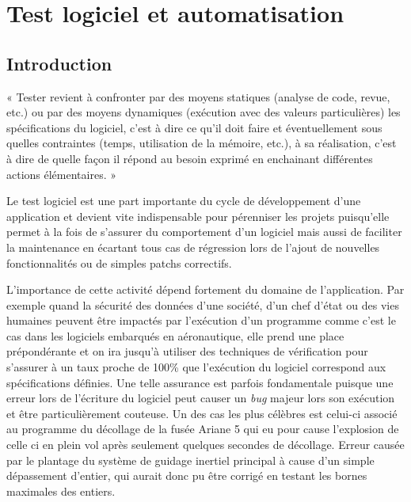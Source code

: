 \chapter{Test logiciel et automatisation} %

\label{Chapter1} %


\section{Introduction}

« Tester revient à confronter par des moyens statiques (analyse de code, revue, etc.) ou par des moyens dynamiques (exécution avec des valeurs particulières) les spécifications du logiciel, c’est à dire ce qu’il doit faire et éventuellement sous quelles contraintes (temps, utilisation de la mémoire, etc.), à sa réalisation, c’est à dire de quelle façon il répond au besoin exprimé en enchainant différentes actions élémentaires. »\cite{jfpp-test}

Le test logiciel est une part importante du cycle de développement d'une application et devient vite indispensable pour pérenniser les projets puisqu'elle permet à la fois de s'assurer du comportement d'un logiciel mais aussi de faciliter la maintenance en écartant tous cas de régression lors de l'ajout de nouvelles fonctionnalités ou de simples patchs correctifs.

L'importance de cette activité dépend fortement du domaine de l'application.
Par exemple quand la sécurité des données d'une société, d'un chef d'état ou des vies humaines peuvent être impactés par l'exécution d'un programme comme c'est le cas dans les logiciels embarqués en aéronautique, elle prend une place prépondérante et on ira jusqu'à utiliser des techniques de vérification pour s'assurer à un taux proche de 100\% que l'exécution du logiciel correspond aux spécifications définies. 
Une telle assurance est parfois fondamentale puisque une erreur lors de l'écriture du logiciel peut causer un \textit{bug} majeur lors son exécution et être particulièrement couteuse. Un des cas les plus célèbres est celui-ci associé au programme du décollage de la fusée Ariane 5\cite{ariane5} qui eu pour cause l'explosion de celle ci en plein vol après seulement quelques secondes de décollage. Erreur causée par le plantage du système de guidage inertiel principal à cause d'un simple dépassement d'entier, qui aurait donc pu être corrigé en testant les bornes maximales des entiers.

